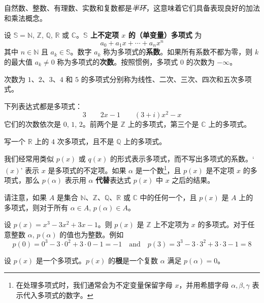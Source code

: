 自然数、整数、有理数、实数和复数都是\textit{半环}，这意味着它们具备表现良好的加法和乘法概念。

\begin{definition}
\label{defPolynomialPreliminary}
设 $\mathbb{S} = \mathbb{N}$, $\mathbb{Z}$, $\mathbb{Q}$, $\mathbb{R}$ 或 $\mathbb{C}$。\textbf{$\mathbb{S}$ 上不定项 $x$ 的（单变量）多项式} 为
\[ a_0 + a_1x + \cdots + a_nx^n \]
其中 $n \in \mathbb{N}$ 且 $a_k \in \mathbb{S}$。数字 $a_k$ 称为多项式的\textbf{系数}。如果所有系数不都为零，则 $k$ 的最大值 $a_k \ne 0$ 称为多项式的\textbf{次数}。按照惯例，多项式 $0$ 的次数为 $-\infty$。
\end{definition}

次数为 $1$、$2$、$3$、$4$ 和 $5$ 的多项式分别称为线性、二次、三次、四次和五次多项式。

\begin{example}
下列表达式都是多项式：
\[ 3 \qquad 2x-1 \qquad (3+i)x^2-x \]
它们的次数依次是 $0$, $1$, $2$。前两个是 $\mathbb{Z}$ 上的多项式，第三个是 $\mathbb{C}$ 上的多项式。
\end{example}

\begin{exercise}
写一个 $\mathbb{R}$ 上的 $4$ 次多项式，且不是 $\mathbb{Q}$ 上的多项式。
\end{exercise}

\begin{notation}
我们经常用类似 $p(x)$ 或 $q(x)$ 的形式表示多项式，而不写出多项式的系数。`$(x)$' 表示 $x$ 是多项式的不定项。如果 $\alpha$ 是一个数\footnote{在处理多项式时，我们通常会为不定变量保留字母 $x$，并用希腊字母 $\alpha,\beta,\gamma$  表示代入多项式的数字。}，且 $p(x)$ 是不定项 $x$ 的多项式，那么 $p(\alpha)$ 表示用 $\alpha$ \textbf{代替}表达式 $p(x)$ 中 $x$ 之后的结果。
\end{notation}

请注意，如果 $A$ 是集合 $\mathbb{N}$、$\mathbb{Z}$、$\mathbb{Q}$、$\mathbb{R}$ 或 $\mathbb{C}$ 中的任何一个，且 $p(x)$ 是 $A$ 上的多项式，则对于所有 $\alpha \in A$, $p(\alpha) \in A$。

\begin{example}
设 $p(x)=x^3-3x^2+3x-1$。则 $p(x)$ 是 $\mathbb{Z}$ 上不定项为 $x$ 的多项式。对于任意整数 $\alpha$, $p(\alpha)$ 的值也为整数。例如
\[ p(0) = 0^3-3 \cdot 0^2 + 3 \cdot 0 - 1 = -1 \quad \text{and} \quad p(3) = 3^3 - 3 \cdot 3^2 + 3 \cdot 3 - 1 = 8 \]
\end{example}

\begin{definition}
\label{defRootOfPolynomial}
设 $p(x)$ 是一个多项式。$p(x)$ 的\textbf{根}是一个复数 $\alpha$ 满足 $p(\alpha)=0$。
\end{definition}

